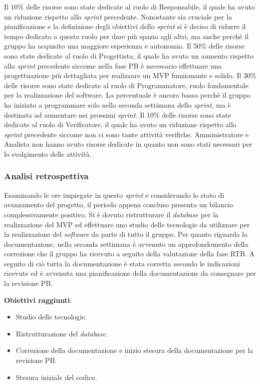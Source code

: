 Il 10\% delle risorse sono state dedicate al ruolo di Responsabile, il quale ha avuto un riduzione rispetto allo \textit{sprint} precedente. Nonostante sia 
cruciale per la pianificazione e la definizione degli obiettivi dello \textit{sprint} si è deciso di ridurre il tempo dedicato a questo ruolo per dare più spazio agli altri, ma anche perchè il gruppo 
ha acquisito una maggiore esperienza e autonomia. Il 50\% delle risorse sono state dedicate al ruolo di Progettista, il quale ha avuto un aumento rispetto allo \textit{sprint} 
precedente siccome nella fase PB è necessario effettuare una progettuazione più dettagliata per realizzare un MVP funzionante e solido.
Il 30\% delle risorse sono state dedicate al ruolo di Programmatore, ruolo fondamentale per la realizzazione del software. La percentuale è ancora bassa perchè 
il gruppo ha iniziato a programmare solo nella seconda settimana dello \textit{sprint}, ma è destinata ad aumentare nei prossimi \textit{sprint}. 
Il 10\% delle risorse sono state dedicate al ruolo di Verificatore, il quale ha avuto un riduzione rispetto allo \textit{sprint} precedente siccome non ci sono tante attività verifiche.
Amministratore e Analista non hanno avuto risorse dedicate in quanto non sono stati necessari per lo svolgimento delle attività.


\subsubsection{Analisi retrospettiva}
Esaminando le ore impiegate in questo \textit{sprint} e considerando lo stato di avanzamento del progetto, il periodo appena concluso presenta un bilancio complessivamente positivo.
Si è dovuto ristrutturare il \textit{database} per la realizzazione del MVP ed effettuare uno studio delle tecnologie da utilizzare per la realizzazione del \textit{software} da parte di tutto il gruppo.
Per quanto riguarda la documentazione, nella seconda settimana è avvenuto un approfondomento della correzione che il gruppo ha ricevuto a seguito della valutazione della fase RTB.
A seguito di ciò tutta la documentazione è stata corretta secondo le indicazioni ricevute ed è avvenuta una pianificazione della documentazione da consegnare per la revisione PB.

\textbf{Obiettivi raggiunti}:
\begin{itemize}
	\item Studio delle tecnologie.
	\item Ristrutturazione del \textit{database}.
	\item Correzione della documentazione e inizio stesura della documentazione per la revisione PB.
	\item Stesura iniziale del codice.
\end{itemize}


